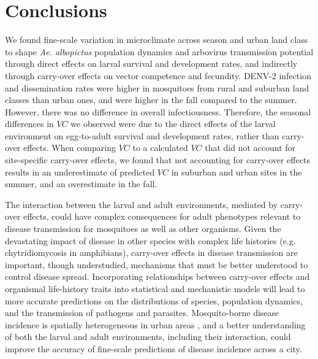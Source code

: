 \documentclass[doublespacing, linenumbers]{bmcart}
\begin{document}
\section*{Conclusions}

We found fine-scale variation in microclimate across season and urban land class to shape \textit{Ae. albopictus} population dynamics and arbovirus transmission potential through direct effects on larval survival and development rates, and indirectly through carry-over effects on vector competence and fecundity.
DENV-2 infection and dissemination rates were higher in mosquitoes from rural and suburban land classes than urban ones, and were higher in the fall compared to the summer.
However, there was no difference in overall infectiousness.
Therefore, the seasonal differences in $VC$ we observed were due to the direct effects of the larval environment on egg-to-adult survival and development rates, rather than carry-over effects.
When comparing $VC$ to a calculated $VC$ that did not account for site-specific carry-over effects, we found that not accounting for carry-over effects results in an underestimate of predicted $VC$ in suburban and urban sites in the summer, and an overestimate in the fall.

The interaction between the larval and adult environments, mediated by carry-over effects, could have complex consequences for adult phenotypes relevant to disease transmission for mosquitoes as well as other organisms.
Given the devastating impact of disease in other species with complex life histories (e.g. chytridiomycosis in amphibians), carry-over effects in disease transmission are important, though understudied, mechanisms that must be better understood to control disease spread.
Incorporating relationships between carry-over effects and organismal life-history traits into statistical and mechanistic models will lead to more accurate predictions on the distributions of species, population dynamics, and the transmission of pathogens and parasites.
Mosquito-borne disease incidence is spatially heterogeneous in urban areas \cite{santos-vega2016}, and a better understanding of both the larval and adult environments, including their interaction, could improve the accuracy of fine-scale predictions of disease incidence across a city.


\end{document}
